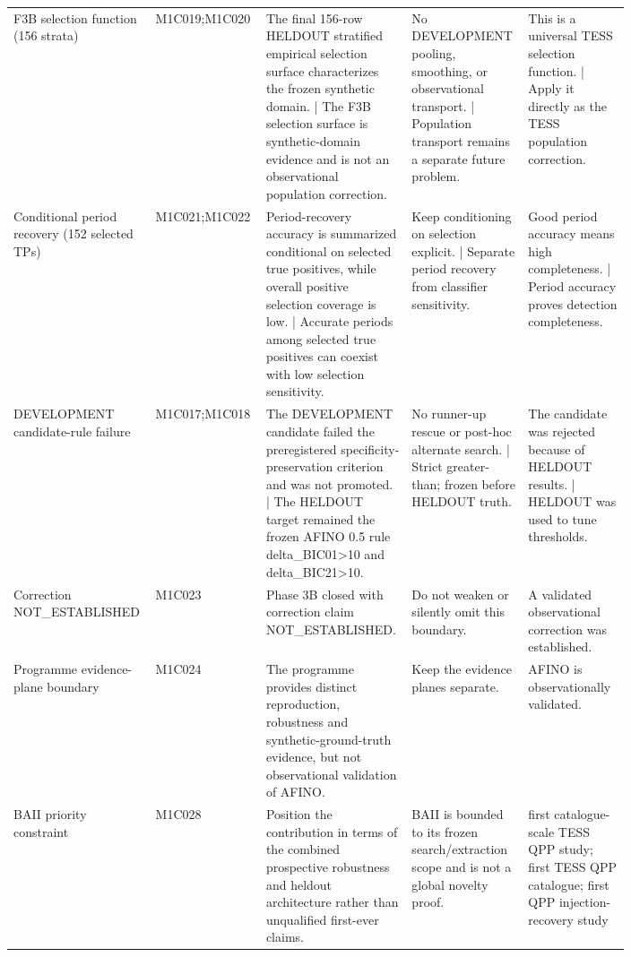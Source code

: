 \begin{table}[t]
\begin{tabular}{p{0.16\linewidth}p{0.16\linewidth}p{0.16\linewidth}p{0.16\linewidth}p{0.16\linewidth}}
F3B selection function (156 strata) & M1C019;M1C020 & The final 156-row HELDOUT stratified empirical selection surface characterizes the frozen synthetic domain. | The F3B selection surface is synthetic-domain evidence and is not an observational population correction. & No DEVELOPMENT pooling, smoothing, or observational transport. | Population transport remains a separate future problem. & This is a universal TESS selection function. | Apply it directly as the TESS population correction. \\
Conditional period recovery (152 selected TPs) & M1C021;M1C022 & Period-recovery accuracy is summarized conditional on selected true positives, while overall positive selection coverage is low. | Accurate periods among selected true positives can coexist with low selection sensitivity. & Keep conditioning on selection explicit. | Separate period recovery from classifier sensitivity. & Good period accuracy means high completeness. | Period accuracy proves detection completeness. \\
DEVELOPMENT candidate-rule failure & M1C017;M1C018 & The DEVELOPMENT candidate failed the preregistered specificity-preservation criterion and was not promoted. | The HELDOUT target remained the frozen AFINO 0.5 rule delta\_BIC01>10 and delta\_BIC21>10. & No runner-up rescue or post-hoc alternate search. | Strict greater-than; frozen before HELDOUT truth. & The candidate was rejected because of HELDOUT results. | HELDOUT was used to tune thresholds. \\
Correction NOT\_ESTABLISHED & M1C023 & Phase 3B closed with correction claim NOT\_ESTABLISHED. & Do not weaken or silently omit this boundary. & A validated observational correction was established. \\
Programme evidence-plane boundary & M1C024 & The programme provides distinct reproduction, robustness and synthetic-ground-truth evidence, but not observational validation of AFINO. & Keep the evidence planes separate. & AFINO is observationally validated. \\
BAII priority constraint & M1C028 & Position the contribution in terms of the combined prospective robustness and heldout architecture rather than unqualified first-ever claims. & BAII is bounded to its frozen search/extraction scope and is not a global novelty proof. & first catalogue-scale TESS QPP study; first TESS QPP catalogue; first QPP injection-recovery study \\
\hline
\end{tabular}
\end{table}
